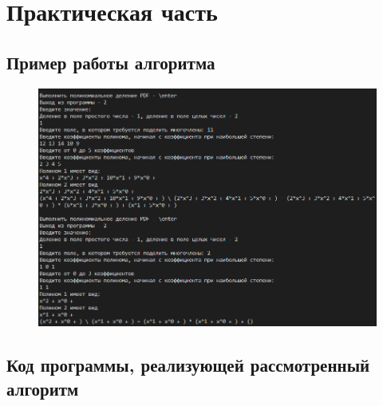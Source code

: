 \documentclass[bachelor, och, labwork]{shiza}
\begin{document}
\section{Практическая часть}
\subsection{Пример работы алгоритма}
\begin{figure}[H]
    \centering
    \includegraphics[width=1\textwidth]{pic1.png}
    \caption{}
\end{figure}

    \subsection{Код программы, реализующей рассмотренный алгоритм}
        \inputminted{python}{lab13.py}
\end{document}
